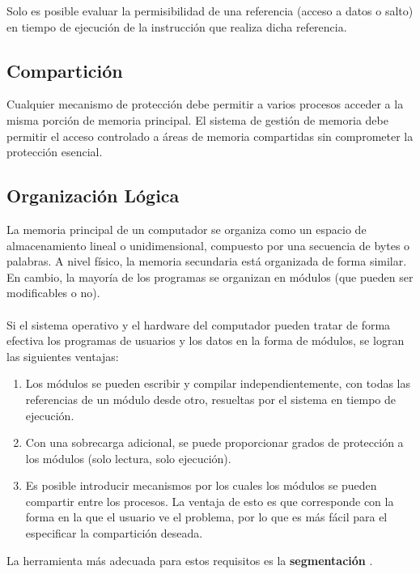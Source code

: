 \documentclass[12pt,a4paper]{article}
\begin{document}
\begin{tcolorbox}[colback=cyan!10, colframe=blue!70, title=Nota]
    Solo es posible evaluar la permisibilidad de una referencia (acceso a datos o salto) en tiempo de ejecución de la instrucción que realiza dicha referencia.
\end{tcolorbox}
\subsection{Compartición}
Cualquier mecanismo de protección debe permitir a varios procesos acceder a la misma porción de memoria principal. El sistema de gestión de memoria debe permitir el acceso controlado a áreas de memoria compartidas sin comprometer la protección esencial.
\subsection{Organización Lógica}
La memoria principal de un computador se organiza como un espacio de almacenamiento lineal o unidimensional, compuesto por una secuencia de bytes o palabras. A nivel físico, la memoria secundaria está organizada de forma similar. En cambio, la mayoría de los programas se organizan en módulos (que pueden ser modificables o no).\\\\ 
Si el sistema operativo y el hardware del computador pueden tratar de forma efectiva los programas de usuarios y los datos en la forma de módulos, se logran las siguientes ventajas:
\begin{enumerate}
    \item Los módulos se pueden escribir y compilar independientemente, con todas las referencias de un módulo desde otro, resueltas por el sistema en tiempo de ejecución.
    \item Con una sobrecarga adicional, se puede proporcionar grados de protección a los módulos (solo lectura, solo ejecución).
    \item Es posible introducir mecanismos por los cuales los módulos se pueden compartir entre los procesos. La ventaja de esto es que corresponde con la forma en la que el usuario ve el problema, por lo que es más fácil para el especificar la compartición deseada.
\end{enumerate}
\begin{tcolorbox}[colback=cyan!10, colframe=blue!70, title=Nota]
    La herramienta más adecuada para estos requisitos es la \textbf{segmentación} .
\end{tcolorbox}
\end{document}
